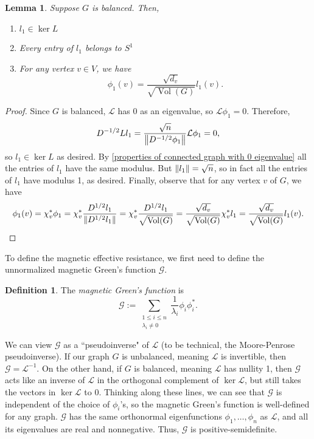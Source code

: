 \documentclass{article}
\newtheorem{lem}[thm]{Lemma}
\theoremstyle{definition}
\newtheorem{defn}[thm]{Definition}
\DeclarePairedDelimiter\norm{\lVert}{\rVert}
\DeclareMathOperator{\vol}{Vol}
\newcommand{\lap}{\mathcal{L}}
\newcommand{\green}{\mathcal{G}}
\begin{document}
\begin{lem}\label{eigenvectors of normalized lap via eigenvectors of lap}
Suppose $G$ is balanced. Then,
\begin{enumerate}
\item $l_1 \in \ker L$
\item Every entry of $l_1$ belongs to $S^1$
\item For any vertex $v \in V$, we have 
$$
\phi_1(v) = \frac{\sqrt{d_v}}{\sqrt{\vol(G)}} l_1(v).
$$
\end{enumerate}
\end{lem}
\begin{proof}
Since $G$ is balanced, $\lap$ has 0 as an eigenvalue, so $\lap \phi_1 = 0.$ Therefore,
$$
D^{-1/2} L l_1 = \frac{\sqrt{n}}{\norm*{D^{-1/2} \phi_1}} \lap \phi_1 = 0,
$$
so $l_1 \in \ker L$ as desired. By \cref{properties of connected graph with 0 eigenvalue} all the entries of $l_1$ have the same modulus. But $\norm{l_1} = \sqrt{n}$, so in fact all the entries of $l_1$ have modulus 1, as desired. Finally, observe that for any vertex $v$ of $G$, we have
$$
\phi_1(v)
= \chi_v^* \phi_1
= \chi_v^* \frac{D^{1/2} l_1}{\norm{D^{1/2} l_1}} 
= \chi_v^* \frac{D^{1/2} l_1}{\sqrt{\vol(G)}}
= \frac{\sqrt{d_v}}{\sqrt{\vol(G)}} \chi_v^* l_1
= \frac{\sqrt{d_v}}{\sqrt{\vol(G)}} l_1(v).
$$
\end{proof}

To define the magnetic effective resistance, we first need to define the unnormalized magnetic Green's function $\green$.

\begin{defn}
The \textit{magnetic Green's function} is 
$$
\green := \sum_{\substack{1 \leq i \leq n \\ \lambda_i \neq 0}} \frac{1}{\lambda_i} \phi_i \phi_i^*.
$$
\end{defn}

We can view $\green$ as a ``pseudoinverse" of $\lap$ (to be technical, the Moore-Penrose pseudoinverse). If our graph $G$ is unbalanced, meaning $\lap$ is invertible, then $\green = \lap^{-1}$. On the other hand, if $G$ is balanced, meaning $\lap$ has nullity 1, then $\green$ acts like an inverse of $\lap$ in the orthogonal complement of $\ker \lap$, but still takes the vectors in $\ker \lap$ to 0. Thinking along these lines, we can see that $\green$ is independent of the choice of $\phi_i$'s, so the magnetic Green's function is well-defined for any graph. $\green$ has the same orthonormal eigenfunctions $\phi_1, \dots, \phi_n$ as $\lap$, and all its eigenvalues are real and nonnegative. Thus, $\green$ is positive-semidefinite. 
\end{document}

